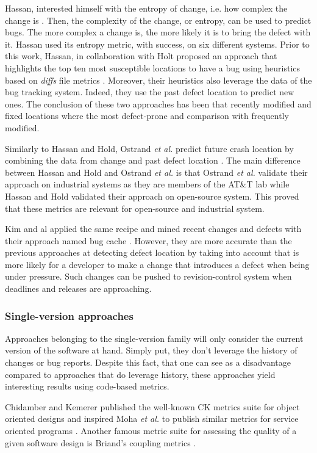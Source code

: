 Hassan, interested himself with the entropy of change, i.e. how complex the change is \cite{Hassan2009}.
Then, the complexity of the change, or entropy, can be used to predict bugs.
The more complex a change is, the more likely it is to bring the defect with it.
Hassan used its entropy metric, with success, on six different systems.
Prior to this work, Hassan, in collaboration with Holt proposed an approach that highlights the top ten most susceptible locations to have a bug using heuristics based on \textit{diffs} file metrics \cite{Hassan2005}.
Moreover, their heuristics also leverage the data of the bug tracking system.
Indeed, they use the past defect location to predict new ones.
The conclusion of these two approaches has been that recently modified and fixed locations where the most defect-prone and comparison with frequently modified.

Similarly to Hassan and Hold,  Ostrand \textit{et al.} predict future crash location by combining the data from change and past defect location \cite{Ostrand2005}.
The main difference between Hassan and Hold and Ostrand \textit{et al.} is that Ostrand \textit{et al.} validate their approach on industrial systems as they are members of the AT\&T lab while Hassan and Hold validated their approach on open-source system.
This proved that these metrics are relevant for open-source and industrial system.

Kim and al applied the same recipe and mined recent changes and defects with their approach named bug cache \cite{Kim2007a}.
However, they are more accurate than the previous approaches at detecting defect location by taking into account that is more likely for a developer to make a change that introduces a defect when being under pressure.
Such changes can be pushed to revision-control system when deadlines and releases are approaching.

\subsubsection{Single-version approaches}

Approaches belonging to the single-version family will only consider the current version of the software at hand.
Simply put, they don't leverage the history of changes or bug reports.
Despite this fact, that one can see as a disadvantage compared to approaches that do leverage history, these approaches yield interesting results using code-based metrics.

Chidamber and Kemerer published the well-known CK metrics suite \cite{Chidamber1994} for object oriented designs and inspired Moha \textit{et al.} to publish similar metrics for service oriented programs \cite{Moha}.
Another famous metric suite for assessing the quality of a given software design is Briand's coupling metrics \cite{Briand1999a}.

